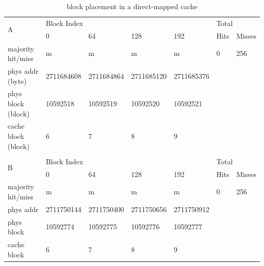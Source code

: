 \documentclass[12pt]{article}
\begin{document}
\begin{table}[H]
\centering
\caption{block placement in a direct-mapped cache}
\begin{tabular}{lllllll}
\multicolumn{1}{l|}{\multirow{2}{*}{A}}  & \multicolumn{4}{l|}{Block Index}                                       & \multicolumn{2}{l}{Total} \\
\multicolumn{1}{l|}{}                    & 0          & 64         & 128        & \multicolumn{1}{l|}{192}        & Hits       & Misses       \\ \hline
\multicolumn{1}{l|}{majority hit/miss}   & m          & m          & m          & \multicolumn{1}{l|}{m}          & 0          & 256          \\
\multicolumn{1}{l|}{phys addr (byte)}    & 2711684608 & 2711684864 & 2711685120 & \multicolumn{1}{l|}{2711685376} &            &              \\
\multicolumn{1}{l|}{phys block (block)}  & 10592518   & 10592519   & 10592520   & \multicolumn{1}{l|}{10592521}   &            &              \\
\multicolumn{1}{l|}{cache block (block)} & 6          & 7          & 8          & \multicolumn{1}{l|}{9}          &            &              \\
                                         &            &            &            &                                 &            &              \\
\multicolumn{1}{l|}{\multirow{2}{*}{B}}  & \multicolumn{4}{l|}{Block Index}                                       & \multicolumn{2}{l}{Total} \\
\multicolumn{1}{l|}{}                    & 0          & 64         & 128        & \multicolumn{1}{l|}{192}        & Hits       & Misses       \\ \hline
\multicolumn{1}{l|}{majority hit/miss}   & m          & m          & m          & \multicolumn{1}{l|}{m}          & 0          & 256          \\
\multicolumn{1}{l|}{phys addr}           & 2711750144 & 2711750400 & 2711750656 & \multicolumn{1}{l|}{2711750912} &            &              \\
\multicolumn{1}{l|}{phys block}          & 10592774   & 10592775   & 10592776   & \multicolumn{1}{l|}{10592777}   &            &              \\
\multicolumn{1}{l|}{cache block}         & 6          & 7          & 8          & \multicolumn{1}{l|}{9}          &            &              \\

\end{tabular}
\end{table}
\end{document}
